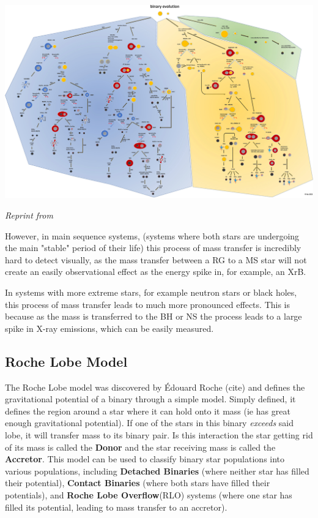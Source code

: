 \documentclass[12pt, letterpaper]{article}
\begin{document}
    \begin{center}
        \includegraphics[width=\textwidth]{figs/Binary Evolution Flowchart.jpg}

        \textit{Reprint from \cite{Chen_2024}}
    \end{center}

    However, in main sequence systems, (systems where both stars are undergoing the main "stable" period of their life) this process of mass transfer is incredibly hard to detect visually, as the mass transfer between a RG to a MS star will not create an easily observational effect as the energy spike in, for example, an XrB. 

    In systems with more extreme stars, for example neutron stars or black holes, this process of mass transfer leads to much more pronounced effects. This is because as the mass is transferred to the BH or NS the process leads to a large spike in X-ray emissions, which can be easily measured.






    
    \subsection{\centering Roche Lobe Model} %
    The Roche Lobe model was discovered by Édouard Roche (cite) and defines the gravitational potential of a binary through a simple model. Simply defined, it defines the region around a star where it can hold onto it mass (ie has great enough gravitational potential). If one of the stars in this binary \textit{exceeds} said lobe, it will transfer mass to its binary pair. Is this interaction the star getting rid of its mass is called the \textbf{Donor} and the star receiving mass is called the \textbf{Accretor}. This model can be used to classify binary star populations into various populations, including \textbf{Detached Binaries} (where neither star has filled their potential), \textbf{Contact Binaries} (where both stars have filled their potentials), and \textbf{Roche Lobe Overflow}(RLO) systems (where one star has filled its potential, leading to mass transfer to an accretor).
    
\end{document}
